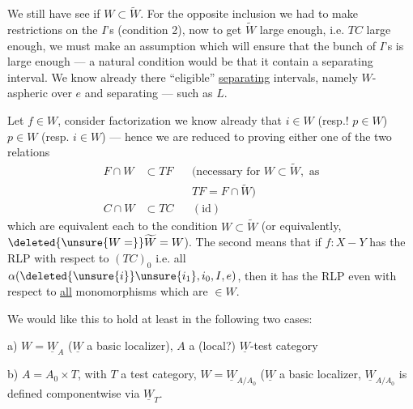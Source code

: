 
We still have  see if $W\subset\widetilde W$. For the opposite inclusion we had to make restrictions on the $I$'s  (condition 2), now to get $\widetilde W$ large enough, i.e. $TC$ large enough, we must make an assumption which will ensure that the bunch of $I$'s is large enough --- a natural condition would be that it contain a separating interval. We know already there  ``eligible'' \uline{separating} intervals, namely $W$-aspheric over $e$ and separating --- such as $L$.


Let $f\in W$, consider factorization
we know already that $i\in W$ (resp.! $p\in W$)  $p\in W$ (resp. $i\in W$) --- hence we are reduced to  proving either one of the two relations
\[
\begin{aligned}
 F\cap W&\subset TF &&\text{(necessary for }W\subset\widetilde W,\text{ as}\\
 &&& TF=F\cap\widetilde W\text{)}\\
 C\cap W&\subset TC &&(\mathrm{id})
\end{aligned}
\]
which are  equivalent  each to the condition $W\subset\widetilde W$ (or equivalently, $\deleted{\unsure{W=}}\widetilde W=W$). The second \inserted{[first?]} means that if $f:X-Y$ \inserted{[is in $W$ and]} has the  RLP with respect to $(TC)_0$ i.e.  all $\alpha(\deleted{\unsure{i}}\unsure{i_1},i_0,I,e)$, then it has the RLP even with respect to \uline{all} monomorphisms which are $\in W$. \inserted{[????]}

We would like this to hold at least in the following two cases:

a) $W=\underline W_A$ ($\underline W$ a basic localizer), $A$ a (local?) $\underline W$-test category

b) $A=A_0\times T$,  with $T$ a test category, $W=\underline W_{A/A_0}$ ($\underline W$ a basic localizer, $\underline W_{A/A_0}$ is defined componentwise via $\underline W_T$.

